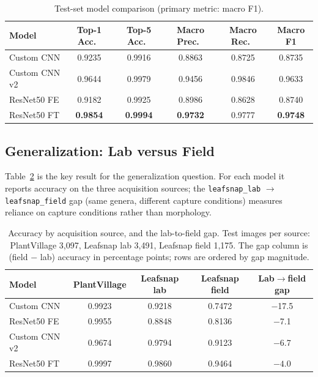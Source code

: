 \documentclass[12pt,a4paper]{article}
\begin{document}
\begin{table}[H]
    \centering
    \caption{Test-set model comparison (primary metric: macro F1).}
    \label{tab:main}
    \begin{tabular}{lccccc}
        \toprule
        Model & Top-1 Acc.\ & Top-5 Acc.\ & Macro Prec.\ & Macro Rec.\ & Macro F1 \\
        \midrule
        Custom CNN & 0.9235 & 0.9916 & 0.8863 & 0.8725 & 0.8735 \\
        Custom CNN v2 & 0.9644 & 0.9979 & 0.9456 & 0.9846 & 0.9633 \\
        ResNet50 FE & 0.9182 & 0.9925 & 0.8986 & 0.8628 & 0.8740 \\
        ResNet50 FT & \textbf{0.9854} & \textbf{0.9994} & \textbf{0.9732} & 0.9777 & \textbf{0.9748} \\
        \bottomrule
    \end{tabular}
\end{table}

\subsection{Generalization: Lab versus Field}
Table~\ref{tab:source} is the key result for the generalization question. For each model it reports accuracy on the three acquisition sources; the \texttt{leafsnap\_lab} $\rightarrow$ \texttt{leafsnap\_field} gap (same genera, different capture conditions) measures reliance on capture conditions rather than morphology.

\begin{table}[H]
    \centering
    \caption{Accuracy by acquisition source, and the lab-to-field gap. Test images per source: PlantVillage 3{,}097, Leafsnap lab 3{,}491, Leafsnap field 1{,}175. The gap column is (field $-$ lab) accuracy in percentage points; rows are ordered by gap magnitude.}
    \label{tab:source}
    \begin{tabular}{lcccc}
        \toprule
        Model & PlantVillage & Leafsnap lab & Leafsnap field & Lab$\rightarrow$field gap \\
        \midrule
        Custom CNN & 0.9923 & 0.9218 & 0.7472 & $-$17.5 \\
        ResNet50 FE & 0.9955 & 0.8848 & 0.8136 & $-$7.1 \\
        Custom CNN v2 & 0.9674 & 0.9794 & 0.9123 & $-$6.7 \\
        ResNet50 FT & 0.9997 & 0.9860 & 0.9464 & $\mathbf{-4.0}$ \\
        \bottomrule
    \end{tabular}
\end{table}
\end{document}
